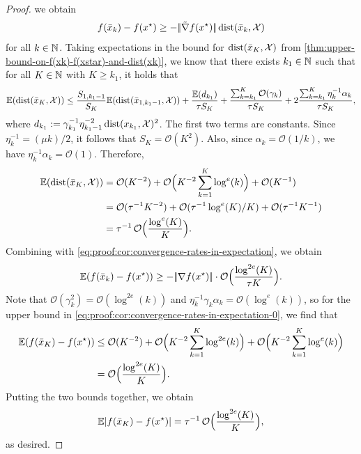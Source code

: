 \begin{proof}
    we obtain
    \begin{equation}
        \label{eq:proof:cor:convergence-rates-in-expectation}
        f(\bar{x}_k) - f(x^\star) \geq - |\!|\tilde{\nabla} f(x^\star)|\!| \operatorname{dist}(\bar{x}_k, \mathcal{X})
    \end{equation}
    for all $k\in\mathbb{N}$.
    Taking expectations in the bound for $\operatorname{dist}(\bar{x}_K, \mathcal{X})$
    from \cref{thm:upper-bound-on-f(xk)-f(xstar)-and-dist(xk)},
    we know that there exists $k_1\in\mathbb{N}$ such that for all $K\in\mathbb{N}$ with $K\geq k_1$,
    it holds that
    \[
        \mathbb{E}(\operatorname{dist}(\bar{x}_K, \mathcal{X}))
        \leq
        \frac{S_{1, k_1-1}}{S_K} \mathbb{E}(\operatorname{dist}(\bar{x}_{1, k_1-1}, \mathcal{X}))
            + \frac{\mathbb{E}(d_{k_1})}{\tau S_K}
            + \frac{\sum_{k=k_1}^{K} \mathcal{O}(\gamma_k)}{\tau S_K}
            + 2 \frac{\sum_{k=k_1}^{K}\eta_k^{-1}\alpha_k}{\tau S_K},
    \]
    where $d_{k_1} := \gamma_{k_1}^{-1} \eta_{k_1-1}^{-2} \operatorname{dist}(x_{k_1}, \mathcal{X})^2$.
    The first two terms are constants.
    Since $\eta_k^{-1} = (\mu k)/2$, it follows that $S_K = \mathcal{O}(K^2)$. Also, since
    $\alpha_k = \mathcal{O}(1/k)$, we have $\eta_k^{-1} \alpha_k = \mathcal{O}(1)$.
    Therefore,
    \begin{align*}
        \mathbb{E}(\operatorname{dist}(\bar{x}_K, \mathcal{X}))
        &=
        \mathcal{O}(K^{-2})
            + \mathcal{O}\Big( K^{-2} \sum_{k=1}^{K} \log^e(k) \Big)
            + \mathcal{O}( K^{-1} ) \\
        &=
        \mathcal{O}(\tau^{-1} K^{-2})
            + \mathcal{O}( \tau^{-1} \log^e(K) / K )
            + \mathcal{O}( \tau^{-1} K^{-1} )  \\
        &= \tau^{-1} \, \mathcal{O} \Big( \frac{\log^{e}(K)}{K} \Big).
    \end{align*}
    Combining with \eqref{eq:proof:cor:convergence-rates-in-expectation}, we obtain
    \[
        \mathbb{E}( f(\bar{x}_k) - f(x^\star) )
        \geq - |\!|\nabla f(x^\star)|\!| \cdot \mathcal{O} \Big( \frac{\log^{2e}(K)}{\tau K} \Big).
    \]
    Note that $\mathcal{O}(\gamma_k^2) = \mathcal{O}(\log^{2e}(k))$ and
    $\eta_k^{-1}\gamma_k\alpha_k = \mathcal{O}(\log^e(k))$,
    so for the upper bound in \eqref{eq:proof:cor:convergence-rates-in-expectation-0}, we find that
    \begin{align*}
        \mathbb{E}(f(\bar{x}_{K}) - f(x^\star))
        &\leq
        \mathcal{O}(K^{-2})
        + \mathcal{O} \Big( K^{-2} \sum_{k=1}^{K} \log^{2e}(k) \Big)
        + \mathcal{O} \Big( K^{-2} \sum_{k=1}^{K} \log^{e}(k) \Big) \\
        &=
        \mathcal{O} \Big( \frac{\log^{2e}(K)}{K} \Big).
    \end{align*} 
    Putting the two bounds together, we obtain
    \[
        \mathbb{E}| f(\bar{x}_{K}) - f(x^\star) |
        = \tau^{-1} \, \mathcal{O} \Big( \frac{\log^{2e}(K)}{K} \Big),
    \]
    as desired.
\end{proof}

